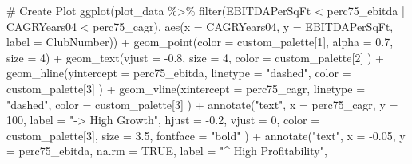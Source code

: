 \documentclass[
  letterpaper,
  oneside,
  11pt]{article}
\newenvironment{Shaded}{\begin{snugshade}}{\end{snugshade}}
\newcommand{\AttributeTok}[1]{\textcolor[rgb]{0.40,0.45,0.13}{#1}}
\newcommand{\CommentTok}[1]{\textcolor[rgb]{0.37,0.37,0.37}{#1}}
\newcommand{\ConstantTok}[1]{\textcolor[rgb]{0.56,0.35,0.01}{#1}}
\newcommand{\DecValTok}[1]{\textcolor[rgb]{0.68,0.00,0.00}{#1}}
\newcommand{\FloatTok}[1]{\textcolor[rgb]{0.68,0.00,0.00}{#1}}
\newcommand{\FunctionTok}[1]{\textcolor[rgb]{0.28,0.35,0.67}{#1}}
\newcommand{\NormalTok}[1]{\textcolor[rgb]{0.00,0.23,0.31}{#1}}
\newcommand{\SpecialCharTok}[1]{\textcolor[rgb]{0.37,0.37,0.37}{#1}}
\newcommand{\StringTok}[1]{\textcolor[rgb]{0.13,0.47,0.30}{#1}}
\begin{document}
\begin{Shaded}
\begin{Highlighting}[]
\CommentTok{\# Create Plot}
\FunctionTok{ggplot}\NormalTok{(plot\_data }\SpecialCharTok{\%\textgreater{}\%} \FunctionTok{filter}\NormalTok{(EBITDAPerSqFt }\SpecialCharTok{\textless{}}\NormalTok{ perc75\_ebitda }\SpecialCharTok{|}\NormalTok{ CAGRYears04 }\SpecialCharTok{\textless{}}\NormalTok{ perc75\_cagr),}
       \FunctionTok{aes}\NormalTok{(}\AttributeTok{x =}\NormalTok{ CAGRYears04, }\AttributeTok{y =}\NormalTok{ EBITDAPerSqFt, }\AttributeTok{label =}\NormalTok{ ClubNumber)) }\SpecialCharTok{+}
  \FunctionTok{geom\_point}\NormalTok{(}\AttributeTok{color =}\NormalTok{ custom\_palette[}\DecValTok{1}\NormalTok{], }
             \AttributeTok{alpha =} \FloatTok{0.7}\NormalTok{, }
             \AttributeTok{size =} \DecValTok{4}\NormalTok{) }\SpecialCharTok{+}
  \FunctionTok{geom\_text}\NormalTok{(}\AttributeTok{vjust =} \SpecialCharTok{{-}}\FloatTok{0.8}\NormalTok{, }
            \AttributeTok{size =} \DecValTok{4}\NormalTok{, }
            \AttributeTok{color =}\NormalTok{ custom\_palette[}\DecValTok{2}\NormalTok{]}
\NormalTok{            ) }\SpecialCharTok{+}
  \FunctionTok{geom\_hline}\NormalTok{(}\AttributeTok{yintercept =}\NormalTok{ perc75\_ebitda, }
             \AttributeTok{linetype =} \StringTok{"dashed"}\NormalTok{, }
             \AttributeTok{color =}\NormalTok{ custom\_palette[}\DecValTok{3}\NormalTok{]}
\NormalTok{             ) }\SpecialCharTok{+}
  \FunctionTok{geom\_vline}\NormalTok{(}\AttributeTok{xintercept =}\NormalTok{ perc75\_cagr, }
             \AttributeTok{linetype =} \StringTok{"dashed"}\NormalTok{, }
             \AttributeTok{color =}\NormalTok{ custom\_palette[}\DecValTok{3}\NormalTok{]}
\NormalTok{             ) }\SpecialCharTok{+}
  \FunctionTok{annotate}\NormalTok{(}\StringTok{"text"}\NormalTok{, }\AttributeTok{x =}\NormalTok{ perc75\_cagr, }\AttributeTok{y =} \DecValTok{100}\NormalTok{,}
           \AttributeTok{label =} \StringTok{"{-}\textgreater{} High Growth"}\NormalTok{,}
           \AttributeTok{hjust =} \SpecialCharTok{{-}}\FloatTok{0.2}\NormalTok{,}
           \AttributeTok{vjust =} \DecValTok{0}\NormalTok{,}
           \AttributeTok{color =}\NormalTok{ custom\_palette[}\DecValTok{3}\NormalTok{],}
           \AttributeTok{size =} \FloatTok{3.5}\NormalTok{,}
           \AttributeTok{fontface =} \StringTok{"bold"}
\NormalTok{           ) }\SpecialCharTok{+}
  \FunctionTok{annotate}\NormalTok{(}\StringTok{"text"}\NormalTok{, }\AttributeTok{x =} \SpecialCharTok{{-}}\FloatTok{0.05}\NormalTok{, }\AttributeTok{y =}\NormalTok{ perc75\_ebitda, }\AttributeTok{na.rm =} \ConstantTok{TRUE}\NormalTok{,}
           \AttributeTok{label =} \StringTok{"\^{} High Profitability"}\NormalTok{,}

\end{Highlighting}
\end{Shaded}
\end{document}
